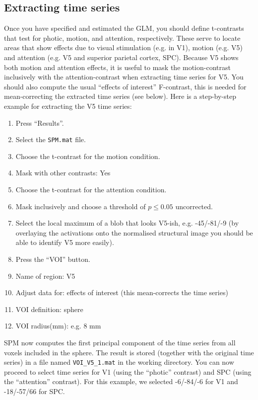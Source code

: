 \subsection{Extracting time series}

Once you have specified and estimated the GLM, you should define t-contrasts that test for photic, motion, and attention, respectively. These serve to locate areas that show effects due to visual stimulation (e.g. in V1), motion (e.g. V5) and attention (e.g. V5 and superior parietal cortex, SPC). Because V5 shows both motion and attention effects, it is useful to mask the motion-contrast inclusively with the attention-contrast when extracting time series for V5. You should also compute the usual ``effects of interest'' F-contrast, this is needed for mean-correcting the extracted time series (see below). Here is a step-by-step example for extracting the V5 time series:
\begin{enumerate}
\item{Press ``Results''.}
\item{Select the \texttt{SPM.mat} file.}
\item{Choose the t-contrast for the motion condition.}
\item{Mask with other contrasts: Yes}
\item{Choose the t-contrast for the attention condition.}
\item{Mask inclusively and choose a threshold of $p \leq 0.05$ uncorrected.}
\item{Select the local maximum of a blob that looks V5-ish, e.g. -45/-81/-9 (by overlaying the activations onto the normalised structural image you should be able to identify V5 more easily).}
\item{Press the ``VOI'' button.}
\item{Name of region: V5}
\item{Adjust data for: effects of interest (this mean-corrects the time series)}
\item{VOI definition: sphere}
\item{VOI radius(mm): e.g. 8 mm}
\end{enumerate}
SPM now computes the first principal component of the time series from all voxels included in the sphere.  The result is stored (together with the original time series) in a file named \verb!VOI_V5_1.mat! in the working directory.  You can now proceed to select time series for V1 (using the ``photic'' contrast) and SPC (using the ``attention'' contrast).  For this example, we selected -6/-84/-6 for V1 and -18/-57/66 for SPC.

